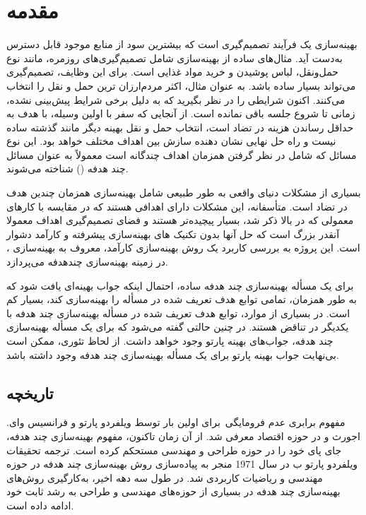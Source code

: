 \chapter{مقدمه}
بهینه‌سازی یک فرآیند تصمیم‌گیری است که بیشترین سود از منابع موجود قابل دسترس به‌دست آید. 
مثال‌های ساده از بهینه‌سازی شامل تصمیم‌گیری‌های روزمره، مانند نوع حمل‌ونقل، لباس پوشیدن و خرید مواد غذایی است. برای این وظایف، تصمیم‌گیری می‌تواند بسیار ساده باشد. به عنوان مثال، اکثر مردم‌ارزان ترین حمل و نقل را انتخاب می‌کنند. اکنون شرایطی را در نظر بگیرید که به دلیل برخی شرایط پیش‌بینی نشده، زمانی تا شروع جلسه باقی نمانده است. از آنجایی که سفر با اولین وسیله، با هدف به حداقل رساندن هزینه در تضاد است، انتخاب حمل و نقل بهینه دیگر مانند گذشته ساده نیست و راه حل نهایی نشان دهنده سازش بین اهداف مختلف خواهد بود. این نوع مسائل که شامل در نظر گرفتن همزمان اهداف چندگانه است معمولاً به عنوان مسائل چند هدفه () شناخته می‌شوند.


بسیاری از مشکلات دنیای واقعی به طور طبیعی شامل بهینه‌سازی همزمان چندین هدف در تضاد است. متأسفانه، این مشکلات دارای اهدافی هستند که در مقایسه با کارهای معمولی که در بالا ذکر شد، بسیار پیچیده‌تر هستند و فضای تصمیم‌گیری اهداف معمولا آنقدر بزرگ است که حل آنها بدون تکنیک های بهینه‌سازی پیشرفته و کارآمد دشوار است. این پروژه به بررسی کاربرد یک روش بهینه‌سازی کارآمد، معروف به بهینه‌سازی ، در زمینه بهینه‌سازی چندهدفه می‌پردازد.


برای یک مسأله بهینه‌سازی چند هدفه ساده، احتمال اینکه جواب بهینه‌ای یافت شود که به طور همزمان، تمامی توابع هدف تعریف شده در مسأله را بهینه‌سازی کند، بسیار کم است. در بسیاری از موارد، توابع هدف تعریف شده در مسأله بهینه‌سازی چند هدفه با یکدیگر در تناقض هستند. در چنین حالتی گفته می‌شود که برای یک مسأله بهینه‌سازی چند هدفه، جواب‌های بهینه پارتو  وجود خواهد داشت. از لحاظ تئوری، ممکن است بی‌نهایت جواب بهینه پارتو برای یک مسأله بهینه‌سازی چند هدفه وجود داشته باشد.

\section{تاریخچه}
مفهوم برابری عدم فرومایگی\ برای اولین بار توسط ویلفردو پارتو و فرانسیس وای. اجورث و در حوزه اقتصاد معرفی شد. از آن زمان تاکنون، مفهوم بهینه‌سازی چند هدفه، جای پای خود را در حوزه طراحی و مهندسی مستحکم کرده است. ترجمه تحقیقات ویلفردو پارتو ب در سال 1971 منجر به پیاده‌سازی روش بهینه‌سازی چند هدفه در حوزه مهندسی و ریاضیات کاربردی شد. در طول سه دهه اخیر، به‌کارگیری روش‌های بهینه‌سازی چند هدفه در بسیاری از حوزه‌های مهندسی و طراحی به رشد ثابت خود ادامه داده است.


